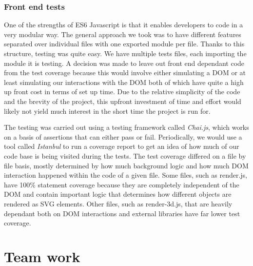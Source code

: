 \documentclass[a4paper]{report}
\begin{document}
	\subsection{Front end tests} \label{sec:frontend-tests}
	\par One of the strengths of ES6 Javascript is that it enables developers to code in a very modular way. The general approach we took was to have different features separated over individual files with one exported module per file. Thanks to this structure, testing was quite easy. We have multiple tests files, each importing the module it is testing. A decision was made to leave out front end dependant code from the test coverage because this would involve either simulating a DOM or at least simulating our interactions with the DOM both of which have quite a high up front cost in terms of set up time. Due to the relative simplicity of the code and the brevity of the project, this upfront investment of time and effort would likely not yield much interest in the short time the project is run for. \newline
	\par The testing was carried out using a testing framework called \textit{Chai.js}, which works on a basis of assertions that can either pass or fail. Periodically, we would use a tool called \textit{Istanbul} to run a coverage report to get an idea of how much of our code base is being visited during the tests. The test coverage differed on a file by file basis, mostly determined by how much background logic and how much DOM interaction happened within the code of a given file. Some files, such as render.js, have 100\% statement coverage because they are completely independent of the DOM and contain important logic that determines how different objects are rendered as SVG elements. Other files, such as render-3d.js, that are heavily dependant both on DOM interactions and external libraries have far lower test coverage. \newline
	
	\chapter{Team work}\label{chapter:teamwork}
\end{document}
